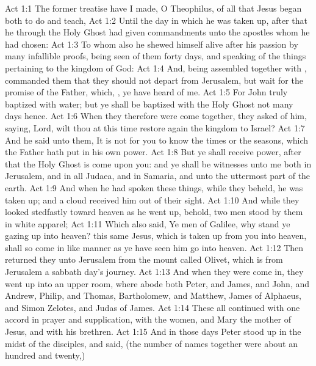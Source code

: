\vs Act 1:1 The former treatise have I made, O Theophilus, of all that Jesus began both to do and teach,
\vs Act 1:2 Until the day in which he was taken up, after that he through the Holy Ghost had given commandments unto the apostles whom he had chosen:
\vs Act 1:3 To whom also he shewed himself alive after his passion by many infallible proofs, being seen of them forty days, and speaking of the things pertaining to the kingdom of God:
\vs Act 1:4 And, being assembled together with , commanded them that they should not depart from Jerusalem, but wait for the promise of the Father, which, , ye have heard of me.
\vs Act 1:5 For John truly baptized with water; but ye shall be baptized with the Holy Ghost not many days hence.
\vs Act 1:6 When they therefore were come together, they asked of him, saying, Lord, wilt thou at this time restore again the kingdom to Israel?
\vs Act 1:7 And he said unto them, It is not for you to know the times or the seasons, which the Father hath put in his own power.
\vs Act 1:8 But ye shall receive power, after that the Holy Ghost is come upon you: and ye shall be witnesses unto me both in Jerusalem, and in all Judaea, and in Samaria, and unto the uttermost part of the earth.
\vs Act 1:9 And when he had spoken these things, while they beheld, he was taken up; and a cloud received him out of their sight.
\vs Act 1:10 And while they looked stedfastly toward heaven as he went up, behold, two men stood by them in white apparel;
\vs Act 1:11 Which also said, Ye men of Galilee, why stand ye gazing up into heaven? this same Jesus, which is taken up from you into heaven, shall so come in like manner as ye have seen him go into heaven.
\vs Act 1:12 Then returned they unto Jerusalem from the mount called Olivet, which is from Jerusalem a sabbath day's journey.
\vs Act 1:13 And when they were come in, they went up into an upper room, where abode both Peter, and James, and John, and Andrew, Philip, and Thomas, Bartholomew, and Matthew, James  of Alphaeus, and Simon Zelotes, and Judas  of James.
\vs Act 1:14 These all continued with one accord in prayer and supplication, with the women, and Mary the mother of Jesus, and with his brethren.
\vs Act 1:15 And in those days Peter stood up in the midst of the disciples, and said, (the number of names together were about an hundred and twenty,)
